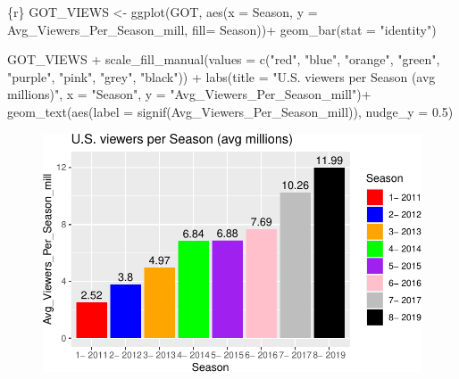 \documentclass[
  letterpaper,
  DIV=11,
  numbers=noendperiod]{scrartcl}
\newenvironment{Shaded}{\begin{snugshade}}{\end{snugshade}}
\newcommand{\AttributeTok}[1]{\textcolor[rgb]{0.40,0.45,0.13}{#1}}
\newcommand{\FloatTok}[1]{\textcolor[rgb]{0.68,0.00,0.00}{#1}}
\newcommand{\FunctionTok}[1]{\textcolor[rgb]{0.28,0.35,0.67}{#1}}
\newcommand{\InformationTok}[1]{\textcolor[rgb]{0.37,0.37,0.37}{#1}}
\newcommand{\NormalTok}[1]{\textcolor[rgb]{0.00,0.23,0.31}{#1}}
\newcommand{\OtherTok}[1]{\textcolor[rgb]{0.00,0.23,0.31}{#1}}
\newcommand{\SpecialCharTok}[1]{\textcolor[rgb]{0.37,0.37,0.37}{#1}}
\newcommand{\StringTok}[1]{\textcolor[rgb]{0.13,0.47,0.30}{#1}}
\begin{document}
\begin{Shaded}
\begin{Highlighting}[]
\InformationTok{\textasciigrave{}\textasciigrave{}\textasciigrave{}\{r\}}
\NormalTok{GOT\_VIEWS }\OtherTok{\textless{}{-}} \FunctionTok{ggplot}\NormalTok{(GOT, }\FunctionTok{aes}\NormalTok{(}\AttributeTok{x =}\NormalTok{ Season, }\AttributeTok{y =}\NormalTok{ Avg\_Viewers\_Per\_Season\_mill, }\AttributeTok{fill=}\NormalTok{ Season))}\SpecialCharTok{+}
  \FunctionTok{geom\_bar}\NormalTok{(}\AttributeTok{stat =} \StringTok{"identity"}\NormalTok{)}

\NormalTok{GOT\_VIEWS }\SpecialCharTok{+} \FunctionTok{scale\_fill\_manual}\NormalTok{(}\AttributeTok{values =} \FunctionTok{c}\NormalTok{(}\StringTok{"red"}\NormalTok{, }\StringTok{"blue"}\NormalTok{, }\StringTok{"orange"}\NormalTok{, }\StringTok{"green"}\NormalTok{, }\StringTok{"purple"}\NormalTok{, }\StringTok{"pink"}\NormalTok{, }\StringTok{"grey"}\NormalTok{, }\StringTok{"black"}\NormalTok{)) }\SpecialCharTok{+} \FunctionTok{labs}\NormalTok{(}\AttributeTok{title =} \StringTok{"U.S. viewers per Season (avg millions)"}\NormalTok{, }\AttributeTok{x =} \StringTok{"Season"}\NormalTok{, }\AttributeTok{y =} \StringTok{"Avg\_Viewers\_Per\_Season\_mill"}\NormalTok{)}\SpecialCharTok{+} \FunctionTok{geom\_text}\NormalTok{(}\FunctionTok{aes}\NormalTok{(}\AttributeTok{label =} \FunctionTok{signif}\NormalTok{(Avg\_Viewers\_Per\_Season\_mill)), }\AttributeTok{nudge\_y =} \FloatTok{0.5}\NormalTok{)}
\InformationTok{\textasciigrave{}\textasciigrave{}\textasciigrave{}}
\end{Highlighting}
\end{Shaded}

\begin{figure}[H]

{\centering \includegraphics{RR_files/figure-pdf/unnamed-chunk-2-1.pdf}

}

\end{figure}
\end{document}
